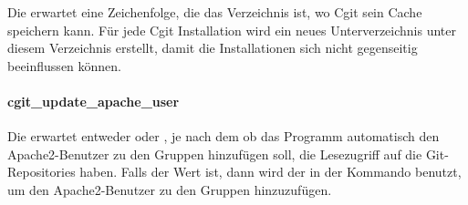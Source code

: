 Die  erwartet eine Zeichenfolge, die das
Verzeichnis ist, wo Cgit sein Cache speichern kann. Für jede Cgit Installation
wird ein neues Unterverzeichnis unter diesem Verzeichnis erstellt, damit die
Installationen sich nicht gegenseitig beeinflussen können.

\paragraph{cgit\_update\_apache\_user}

Die  erwartet entweder  oder
, je nach dem ob das Programm automatisch den Apache2-Benutzer zu
den Gruppen hinzufügen soll, die Lesezugriff auf die Git-Repositories haben.
Falls der Wert  ist, dann wird der in der
 Kommando benutzt, um den Apache2-Benutzer zu den
Gruppen hinzuzufügen.
